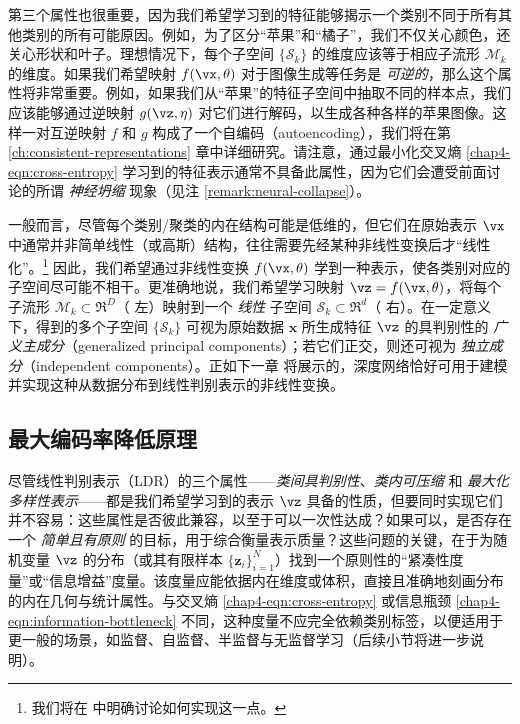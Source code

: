 \documentclass[../../book-main_zh.tex]{subfiles}
\begin{document}
第三个属性也很重要，因为我们希望学习到的特征能够揭示一个类别不同于所有其他类别的所有可能原因。例如，为了区分“苹果”和“橘子”，我们不仅关心颜色，还关心形状和叶子。理想情况下，每个子空间 $\{\mathcal{S}_k\}$ 的维度应该等于相应子流形 $\mathcal{M}_k$ 的维度。如果我们希望映射 $f(\vx,\theta)$ 对于图像生成等任务是 {\em 可逆的}，那么这个属性将非常重要。例如，如果我们从“苹果”的特征子空间中抽取不同的样本点，我们应该能够通过逆映射 $g(\vz, \eta)$ 对它们进行解码，以生成各种各样的苹果图像。这样一对互逆映射 $f$ 和 $g$ 构成了一个自编码（autoencoding），我们将在第 \ref{ch:consistent-representations} 章中详细研究。请注意，通过最小化交叉熵 \eqref{chap4-eqn:cross-entropy} 学习到的特征表示通常不具备此属性，因为它们会遭受前面讨论的所谓 {\em 神经坍缩} 现象（见注 \ref{remark:neural-collapse}）。

一般而言，尽管每个类别/聚类的内在结构可能是低维的，但它们在原始表示 $\vx$ 中通常并非简单线性（或高斯）结构，往往需要先经某种非线性变换后才“线性化”。\footnote{我们将在  中明确讨论如何实现这一点。} 因此，我们希望通过非线性变换 $f(\vx,\theta)$ 学到一种表示，使各类别对应的子空间尽可能不相干。更准确地说，我们希望学习映射 $\vz = f(\vx,\theta)$，将每个子流形 $\mathcal{M}_k \subset \Re^D$（ 左）映射到一个 {\em 线性} 子空间 $\mathcal{S}_k \subset \Re^d$（ 右）。在一定意义下，得到的多个子空间 $\{\mathcal{S}_k\}$ 可视为原始数据 $\bm x$ 所生成特征 $\vz$ 的具判别性的 {\em 广义主成分}（generalized principal components）\cite{GPCA}；若它们正交，则还可视为 {\em 独立成分}（independent components）\cite{hyvarinen2000independent}。正如下一章  将展示的，深度网络恰好可用于建模并实现这种从数据分布到线性判别表示的非线性变换。

\subsection{最大编码率降低原理}\label{subsec:MCR2}

尽管线性判别表示（LDR）的三个属性——{\em 类间具判别性}、{\em 类内可压缩} 和 {\em 最大化多样性表示}——都是我们希望学习到的表示 $\vz$ 具备的性质，但要同时实现它们并不容易：这些属性是否彼此兼容，以至于可以一次性达成？如果可以，是否存在一个 {\em 简单且有原则} 的目标，用于综合衡量表示质量？这些问题的关键，在于为随机变量 $\vz$ 的分布（或其有限样本 $\{\bm z_i\}_{i=1}^N$）找到一个原则性的“紧凑性度量”或“信息增益”度量。该度量应能依据内在维度或体积，直接且准确地刻画分布的内在几何与统计属性。与交叉熵 \eqref{chap4-eqn:cross-entropy} 或信息瓶颈 \eqref{chap4-eqn:information-bottleneck} 不同，这种度量不应完全依赖类别标签，以便适用于更一般的场景，如监督、自监督、半监督与无监督学习（后续小节将进一步说明）。
\end{document}
